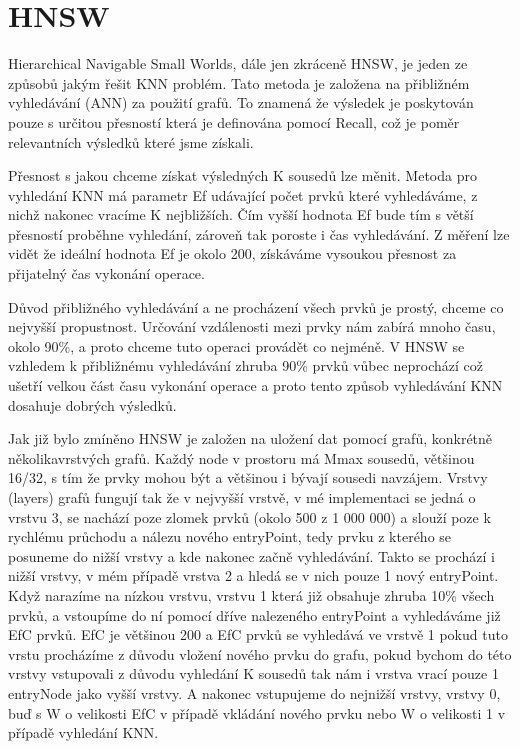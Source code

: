\documentclass[czech,semestral,dept460,male,csharp,cpdeclaration]{diploma}
\begin{document}
	\chapter{HNSW}
	
		Hierarchical Navigable Small Worlds, dále jen zkráceně HNSW, je jeden ze způsobů jakým řešit KNN problém. Tato metoda je založena na přibližném vyhledávání (ANN) za použití grafů. To znamená že výsledek je poskytován pouze s určitou přesností která je definována pomocí Recall, což je poměr relevantních výsledků které jsme získali.
		
		Přesnost s jakou chceme získat výsledných K sousedů lze měnit. Metoda pro vyhledání KNN má parametr Ef udávající počet prvků které vyhledáváme, z nichž nakonec vracíme K nejbližších. Čím vyšší hodnota Ef bude tím s větší přesností proběhne vyhledání, zároveň tak poroste i čas vyhledávání. Z měření lze vidět že ideální hodnota Ef je okolo 200, získáváme vysoukou přesnost za přijatelný čas vykonání operace.
		
		Důvod přibližného vyhledávání a ne procházení všech prvků je prostý, chceme co nejvyšší propustnost. Určování vzdálenosti mezi prvky nám zabírá mnoho času, okolo 90\%, a proto chceme tuto operaci provádět co nejméně. V HNSW se vzhledem k přibližnému vyhledávání zhruba 90\% prvků vůbec neprochází což ušetří velkou část času vykonání operace a proto tento způsob vyhledávání KNN dosahuje dobrých výsledků.
		
		Jak již bylo zmíněno HNSW je založen na uložení dat pomocí grafů, konkrétně několikavrstvých grafů. Každý node v prostoru má Mmax sousedů, většinou 16/32, s tím že prvky mohou být a většinou i bývají sousedi navzájem. Vrstvy (layers) grafů fungují tak že v nejvyšší vrstvě, v mé implementaci se jedná o vrstvu 3, se nachází poze zlomek prvků (okolo 500 z 1 000 000) a slouží poze k rychlému průchodu a nálezu nového entryPoint, tedy prvku z kterého se posuneme do nižší vrstvy a kde nakonec začně vyhledávání. Takto se prochází i nižší vrstvy, v mém případě vrstva 2 a hledá se v nich pouze 1 nový entryPoint. Když narazíme na nízkou vrstvu, vrstvu 1 která již obsahuje zhruba 10\% všech prvků, a vstoupíme do ní pomocí dříve nalezeného entryPoint a vyhledáváme již EfC prvků. EfC je většinou 200 a EfC prvků se vyhledává ve vrstvě 1 pokud tuto vrstu procházíme z důvodu vložení nového prvku do grafu, pokud bychom do této vrstvy vstupovali z důvodu vyhledání K sousedů tak nám i vrstva vrací pouze 1 entryNode jako vyšší vrstvy. A nakonec vstupujeme do nejnižší vrstvy, vrstvy 0, buď s W o velikosti EfC v případě vkládání nového prvku nebo W o velikosti 1 v případě vyhledání KNN.
		
\end{document}
